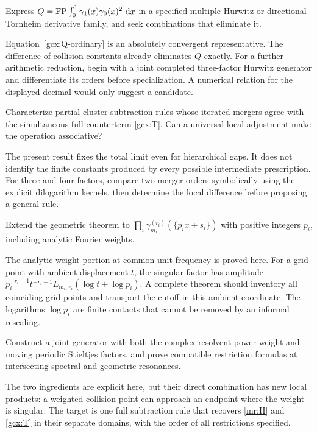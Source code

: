 \begin{question}
Express
$Q=\operatorname{FP}\int_0^1\gamma_1(x)\gamma_0(x)^2\,\,\mathrm d x$
in a specified multiple-Hurwitz or directional Tornheim derivative
family, and seek combinations that eliminate it.
\end{question}
Equation~\eqref{gcx:Q-ordinary} is an absolutely convergent representative.
The difference of collision constants already eliminates $Q$ exactly.
For a further arithmetic reduction, begin with a joint completed
three-factor Hurwitz generator and differentiate its orders before
specialization. A numerical relation for the displayed decimal would
only suggest a candidate.

\begin{question}
Characterize partial-cluster subtraction rules whose iterated mergers
agree with the simultaneous full counterterm \eqref{gcx:T}.
Can a universal local adjustment make the operation associative?
\end{question}
The present result fixes the total limit even for hierarchical gaps.
It does not identify the finite constants produced by every possible
intermediate prescription. For three and four factors, compare two
merger orders symbolically using the explicit dilogarithm kernels,
then determine the local difference before proposing a general rule.

\begin{question}
Extend the geometric theorem to
$\prod_i\gamma_{m_i}^{(r_i)}(\{p_i x+s_i\})$ with positive integers
$p_i$, including analytic Fourier weights.
\end{question}
The analytic-weight portion at common unit frequency is proved here.
For a grid point with ambient displacement $t$, the singular factor
has amplitude
$p_i^{-r_i-1}t^{-r_i-1}L_{m_i,r_i}(\log t+\log p_i)$.
A complete theorem should inventory all coinciding grid points and
transport the cutoff in this ambient coordinate. The logarithms
$\log p_i$ are finite contacts that cannot be removed by an informal
rescaling.

\begin{question}
Construct a joint generator with both the complex resolvent-power
weight and moving periodic Stieltjes factors, and prove compatible
restriction formulas at intersecting spectral and geometric resonances.
\end{question}
The two ingredients are explicit here, but their direct combination
has new local products: a weighted collision point can approach an
endpoint where the weight is singular. The target is one full
subtraction rule that recovers \eqref{mr:H} and \eqref{gcx:T} in
their separate domains, with the order of all restrictions specified.

